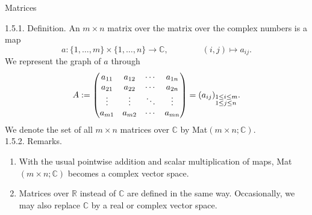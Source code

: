 \documentclass[smaller,hyperref={CJKbookmarks=true}]{beamer}
\newcommand{\C}{\mathbb{C}} \newcommand{\F}{\mathbb{F}} \newcommand{\R}{\mathbb{R}} \newcommand{\Q}{\mathbb{Q}}
\begin{document}
\begin{frame}[t,shrink]{Matrices}
\begin{spacing}{1}
\alert{1.5.1. Definition.} An $m\times n$ matrix over the matrix over the complex numbers is a map
\[a:\{1,\ldots,m\}\times\{1,\ldots,n\}\to\C,\qquad\qquad(i,j)\mapsto a_{ij}.\]
We represent the graph of $a$ through
\begin{equation*}
  A:=\begin{pmatrix}
       a_{11} & a_{12} & \cdots & a_{1n} \\
       a_{21} & a_{22} & \cdots & a_{2n} \\
       \vdots & \vdots & \ddots & \vdots \\
       a_{m1} & a_{m2} & \cdots & a_{mn}
     \end{pmatrix}=(a_{ij})_{\begin{subarray}~1\leq i\leq m\\ 1\leq j\leq n\end{subarray}}.
\end{equation*}
We denote the set of all $m\times n$ matrices over $\C$ by Mat$(m\times n;\C)$.\\
\alert{1.5.2. Remarks.}
\begin{enumerate}[1.]
  \item With the usual pointwise addition and scalar multiplication of maps, Mat$(m\times n;\C)$ becomes a complex vector space.
  \item Matrices over $\R$ instead of $\C$ are defined in the same way. Occasionally, we may also replace $\C$ by a real or complex vector space.
\end{enumerate}
\end{spacing}
\end{frame}
\end{document}
